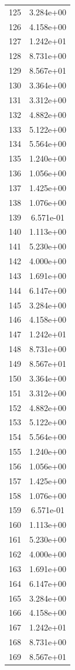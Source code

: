 \documentclass[12pt]{article}
\begin{document}
\begin{longtable}{@{}cc@{}}
125 & 3.284e+00 \\
126 & 4.158e+00 \\
127 & 1.242e+01 \\
128 & 8.731e+00 \\
129 & 8.567e+01 \\
130 & 3.364e+00 \\
131 & 3.312e+00 \\
132 & 4.882e+00 \\
133 & 5.122e+00 \\
134 & 5.564e+00 \\
135 & 1.240e+00 \\
136 & 1.056e+00 \\
137 & 1.425e+00 \\
138 & 1.076e+00 \\
139 & 6.571e-01 \\
140 & 1.113e+00 \\
141 & 5.230e+00 \\
142 & 4.000e+00 \\
143 & 1.691e+00 \\
144 & 6.147e+00 \\
145 & 3.284e+00 \\
146 & 4.158e+00 \\
147 & 1.242e+01 \\
148 & 8.731e+00 \\
149 & 8.567e+01 \\
150 & 3.364e+00 \\
151 & 3.312e+00 \\
152 & 4.882e+00 \\
153 & 5.122e+00 \\
154 & 5.564e+00 \\
155 & 1.240e+00 \\
156 & 1.056e+00 \\
157 & 1.425e+00 \\
158 & 1.076e+00 \\
159 & 6.571e-01 \\
160 & 1.113e+00 \\
161 & 5.230e+00 \\
162 & 4.000e+00 \\
163 & 1.691e+00 \\
164 & 6.147e+00 \\
165 & 3.284e+00 \\
166 & 4.158e+00 \\
167 & 1.242e+01 \\
168 & 8.731e+00 \\
169 & 8.567e+01 \\

\end{longtable}
\end{document}
